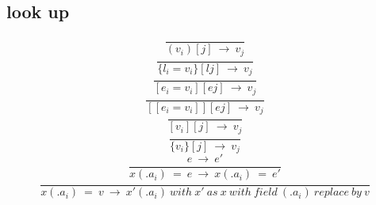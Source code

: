 \documentclass[10pt,a4paper]{article}
\begin{document}
\subsection*{ look up }
\begin{equation}\frac{}{(v_i)[j]     \ \rightarrow \ v_j}\ \tag{\ E-LUPTUPLE\ }\end{equation} 
\begin{equation}\frac{}{\{l_i=v_i\}[lj] \ \rightarrow \ v_j}\ \tag{\ E-LUPRECORD\ }\end{equation}
\begin{equation}\frac{}{[e_i=v_i][ej] \ \rightarrow \ v_j}\ \tag{\ E-LUPMAP\ }\end{equation}
\begin{equation}\frac{}{[[e_i=v_i]][ej] \ \rightarrow \ v_j}\ \tag{\ E-LUPBIGMAP\ }\end{equation}
\begin{equation}\frac{}{[v_i][j]     \ \rightarrow \ v_j}\ \tag{\ E-LUPLIST\ }\end{equation}
\begin{equation}\frac{}{\{v_i\}[j]     \ \rightarrow \ v_j}\ \tag{\ E-LUPSET\ }\end{equation}
\begin{equation}\frac{e\ \rightarrow \ e'}{x(.a_i)\ =\ e\ \rightarrow \ x(.a_i)\ =\ e'}\ \tag{\ E-ASSIGN\ }\end{equation}
\begin{equation}\frac{}{x(.a_i)\ =\ v\ \rightarrow \ x'(.a_i)\ with\ x'\ as\ x\ with\ field\ (.a_i)\ replace\ by\ v}\ \tag{\ E-ASSIGN2\ }\end{equation}
\end{document}
